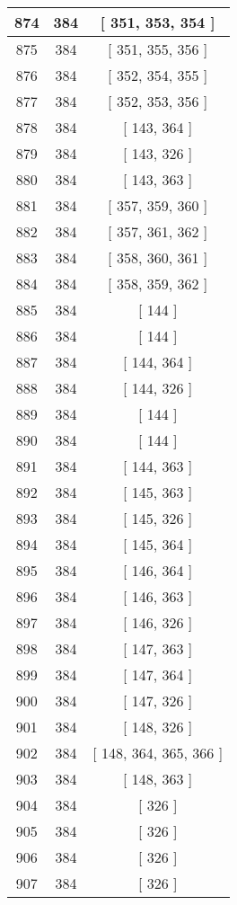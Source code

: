 \begin{center}
\begin{longtable}[H]{|| c c c ||}
\hline
874 & 384 & [ 351, 353, 354 ] \\ 
\hline
875 & 384 & [ 351, 355, 356 ] \\ 
\hline
876 & 384 & [ 352, 354, 355 ] \\ 
\hline
877 & 384 & [ 352, 353, 356 ] \\ 
\hline
878 & 384 & [ 143, 364 ] \\ 
\hline
879 & 384 & [ 143, 326 ] \\ 
\hline
880 & 384 & [ 143, 363 ] \\ 
\hline
881 & 384 & [ 357, 359, 360 ] \\ 
\hline
882 & 384 & [ 357, 361, 362 ] \\ 
\hline
883 & 384 & [ 358, 360, 361 ] \\ 
\hline
884 & 384 & [ 358, 359, 362 ] \\ 
\hline
885 & 384 & [ 144 ] \\ 
\hline
886 & 384 & [ 144 ] \\ 
\hline
887 & 384 & [ 144, 364 ] \\ 
\hline
888 & 384 & [ 144, 326 ] \\ 
\hline
889 & 384 & [ 144 ] \\ 
\hline
890 & 384 & [ 144 ] \\ 
\hline
891 & 384 & [ 144, 363 ] \\ 
\hline
892 & 384 & [ 145, 363 ] \\ 
\hline
893 & 384 & [ 145, 326 ] \\ 
\hline
894 & 384 & [ 145, 364 ] \\ 
\hline
895 & 384 & [ 146, 364 ] \\ 
\hline
896 & 384 & [ 146, 363 ] \\ 
\hline
897 & 384 & [ 146, 326 ] \\ 
\hline
898 & 384 & [ 147, 363 ] \\ 
\hline
899 & 384 & [ 147, 364 ] \\ 
\hline
900 & 384 & [ 147, 326 ] \\ 
\hline
901 & 384 & [ 148, 326 ] \\ 
\hline
902 & 384 & [ 148, 364, 365, 366 ] \\ 
\hline
903 & 384 & [ 148, 363 ] \\ 
\hline
904 & 384 & [ 326 ] \\ 
\hline
905 & 384 & [ 326 ] \\ 
\hline
906 & 384 & [ 326 ] \\ 
\hline
907 & 384 & [ 326 ] \\ 
\hline

\end{longtable}
\end{center}
